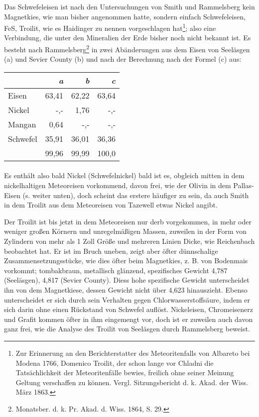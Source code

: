 \documentclass[a4paper, 11pt, oneside]{article}
\begin{document}
Das Schwefeleisen ist nach den Untersuchungen von Smith und Rammelsberg kein Magnetkies, wie man bisher angenommen hatte, sondern einfach Schwefeleisen, FeS, Troilit, wie es Haidinger zu nennen vorgeschlagen hat\footnote{Zur Erinnerung an den Berichterstatter des Meteoritenfalls von Albareto bei Modena 1766, Domenico Troilit, der schon lange vor Chladni die Tatsächlichkeit der Meteoritenfälle bewies, freilich ohne seiner Meinung Geltung verschaffen zu können. Vergl. Sitzungsbericht d. k. Akad. der Wiss. März 1863.}; also eine Verbindung, die unter den Mineralien der Erde bisher noch nicht bekannt ist. Es besteht nach Rammelsberg\footnote{Monatsber. d. k. Pr. Akad. d. Wiss. 1864, S. 29.} in zwei Abänderungen aus dem Eisen von Seeläsgen (a) und Sevier County (b) und nach der Berechnung nach der Formel (c) aus:
\begin{center}
\begin{tabular}{ |l|r|r|r| }
    \hline
     & \emph{a} & \emph{b} & \emph{c}\\
    \hline\hline
    Eisen & 63,41 & 62,22 & 63,64\\\hline
    Nickel & -,- & 1,76 & -,-\\\hline
    Mangan & 0,64 & -,- & -,-\\\hline
    Schwefel & 35,91 & 36,01 & 36,36\\\hline
     & 99,96 & 99,99 & 100,0\\
    \hline
\end{tabular}
\end{center}
\paragraph{}
Es enthält also bald Nickel (Schwefelnickel) bald ist es, obgleich mitten in dem nickelhaltigen Meteoreisen vorkommend, davon frei, wie der Olivin in dem Pallas-Eisen (s. weiter unten), doch scheint das erstere häufiger zu sein, da auch Smith in dem Troilit aus dem Meteoreisen von Tazewell etwas Nickel angibt. 

Der Troilit ist bis jetzt in dem Meteoreisen nur derb vorgekommen, in mehr oder weniger großen Körnern und unregelmäßigen Massen, zuweilen in der Form von Zylindern von mehr als 1 Zoll Größe und mehreren Linien Dicke, wie Reichenbach beobachtet hat. Er ist im Bruch uneben, zeigt aber öfter dünnschalige Zusammensetzungsstücke, wie dies öfter beim Magnetkies, z. B. von Bodenmais vorkommt; tombakbraun, metallisch glänzend, spezifisches Gewicht 4,787 (Seeläsgen), 4,817 (Sevier County). Diess hohe spezifische Gewicht unterscheidet ihn von dem Magnetkiese, dessen Gewicht nicht über 4,623 hinauszieht. Ebenso unterscheidet er sich durch sein Verhalten gegen Chlorwasserstoffsäure, indem er sich darin ohne einen Rückstand von Schwefel auflöst. Nickeleisen, Chromeisenerz und Grafit kommen öfter in ihm eingemengt vor, doch ist er zuweilen auch davon ganz frei, wie die Analyse des Troilit von Seeläsgen durch Rammelsberg beweist.
\end{document}
